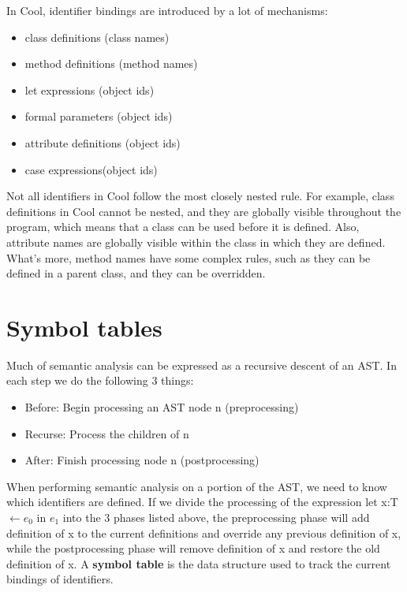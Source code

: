 In Cool, identifier bindings are introduced by a lot of mechanisms:
\begin{itemize}
\item class definitions (class names)
\item method definitions (method names)
\item let expressions (object ids)
\item formal parameters (object ids)
\item attribute definitions (object ids)
\item case expressions(object ids)
\end{itemize}
Not all identifiers in Cool follow the most closely nested rule. For example, class definitions in Cool cannot be nested, and they are globally visible throughout the program, which means that a class can be used before it is defined. Also, attribute names are globally visible within the class in which they are defined. What's more, method names have some complex rules, such as they can be defined in a parent class, and they can be overridden.
\section{Symbol tables}
Much of semantic analysis can be expressed as a recursive descent of an AST. In each step we do the following 3 things:
\begin{itemize}
\item Before: Begin processing an AST node n (preprocessing)
\item Recurse: Process the children of n
\item After: Finish processing node n (postprocessing)
\end{itemize}
When performing semantic analysis on a portion of the AST, we need to know which identifiers are defined. If we divide the processing of the expression {\sf let x:T $\leftarrow e_0$ in $e_1$} into the 3 phases listed above, the preprocessing phase will add definition of x to the current definitions and override any previous definition of x, while the postprocessing phase will remove definition of x and restore the old definition of x. A {\bf symbol table} is the data structure used to track the current bindings of identifiers. 

